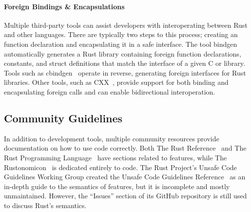 \paragraph{Foreign Bindings \& Encapsulations}
Multiple third-party tools can assist developers with interoperating between Rust and other languages. There are typically two steps to this process; creating an \unsafe function declaration and encapsulating it in a safe interface. The tool bindgen~\cite{bindgen} automatically generates a Rust library containing foreign function declarations, constants, and struct definitions that match the interface of a given C or \CC{} library. Tools such as cbindgen~\cite{cbindgen} operate in reverse, generating foreign interfaces for Rust libraries. Other tools, such as CXX~\cite{cxx}, provide support for both binding and encapsulating foreign calls and can enable bidirectional interoperation.

\subsection{Community Guidelines}
In addition to development tools, multiple community resources provide documentation on how to use \unsafe code correctly. Both The Rust Reference~\cite{rustref} and The Rust Programming Language~\cite{rustbook} have sections related to \unsafe features, while The Rustonomicon~\cite{nomicon} is dedicated entirely to \unsafe code. The Rust Project's Unsafe Code Guidelines Working Group created the Unsafe Code Guidelines Reference~\cite{ucgref} as an in-depth guide to the semantics of \unsafe features, but it is incomplete and mostly unmaintained. However, the ``Issues'' section of its GitHub repository is still used to discuss Rust's semantics. 

